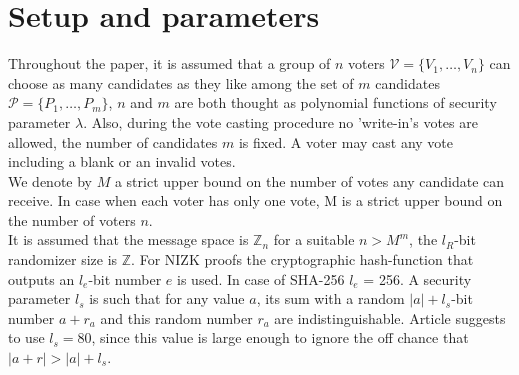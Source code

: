 \section{Setup and parameters}
Throughout the paper, it is assumed that a group of $n$ voters $\mathcal{V} = \{V_1,\dots,V_n\}$ can choose as many candidates as they like among the set of $m$ candidates $\mathcal{P} = \{P_1,\dots,P_m\}$, $n$ and $m$ are both thought as polynomial functions of security parameter $\lambda$. Also, during the vote casting procedure no 'write-in's votes are allowed, the number of candidates $m$ is fixed. A voter may cast any vote including a blank or an invalid votes. \\

We denote by $M$ a strict upper bound on the number of votes any candidate can receive. In case when each voter has only one vote, M is a strict upper bound on the number of voters $n$.\\ 

It is assumed that the message space is $\mathbb{Z}_n$ for a suitable $n > M^m$, the $l_R$-bit randomizer size is  $\mathbb{Z}$. For NIZK proofs the cryptographic hash-function that outputs an $l_e$-bit number $e$ is used. In case of SHA-256  $l_e$ = 256. A security parameter $l_s$ is such that for any value $a$, its sum with a random $|a| + l_s$-bit number $a + r_a$ and this random number $r_a$ are indistinguishable. Article \cite{Groth2005} suggests to use $l_s = 80$, since this value is large enough to ignore the off chance that $|a+r| > |a|+l_s$.

